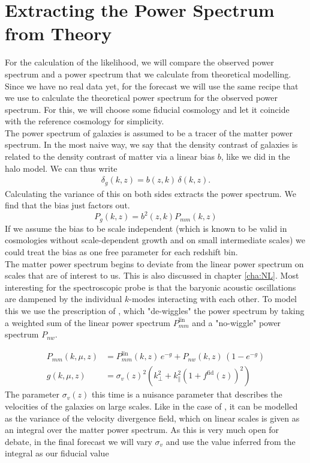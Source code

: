 \documentclass[../main.tex]{subfiles}
\begin{document}
\section{Extracting the Power Spectrum from Theory}
For the calculation of the likelihood, we will compare the observed power spectrum and a power spectrum that we calculate from theoretical modelling. Since we have no real data yet, for the forecast we will use the same recipe that we use to calculate the theoretical power spectrum for the observed power spectrum. For this, we will choose some fiducial cosmology and let it coincide with the reference cosmology for simplicity.\\
The power spectrum of galaxies is assumed to be a tracer of the matter power spectrum. In the most naive way, we say that the density contrast of galaxies is related to the density contrast of matter via a linear bias $b$, like we did in the halo model. We can thus write
\begin{align*}
    \delta_g(k,z) = b(z,k)\,\delta(k,z).
\end{align*}
Calculating the variance of this on both sides extracts the power spectrum. We find that the bias just factors out.  
\begin{equation}
    P_g(k,z) = b^2(z,k) P_{mm}(k,z)
\end{equation}
If we assume the bias to be scale independent (which is known to be valid in cosmologies without scale-dependent growth and on small intermediate scales) we could treat the bias as one free parameter for each redshift bin.\\
The matter power spectrum begins to deviate from the linear power spectrum on scales that are of interest to us. This is also discussed in chapter \ref{cha:NL}. Most interesting for the spectroscopic probe is that the baryonic acoustic oscillations are dampened by the individual $k$-modes interacting with each other. To model this we use the prescription of  \cite{Euclid:2019clj}, which "de-wiggles" the power spectrum by taking a weighted sum of the linear power spectrum $P_{mm}^\mathrm{lin}$ and a "no-wiggle" power spectrum $P_{nw}$.

\begin{align}
    P_{mm}(k,\mu,z) &= P_{mm}^\mathrm{lin}(k,z)\,e^{-g} + P_{nw}(k,z)\,\left(1-e^{-g} \right)\\
    g(k,\mu,z) &= \sigma_v(z)^2 \left(k_\perp^2+k_\|^2\left(1+f^\mathrm{fid}(z)\right)^2 \right)
\end{align}
The parameter $\sigma_v(z)$ this time is a nuisance parameter that describes the velocities of the galaxies on large scales. Like in the case of \hmcode, it can be modelled as the variance of the velocity divergence field, which on linear scales is given as an integral over the matter power spectrum. As this is very much open for debate, in the final forecast we will vary $\sigma_v$ and use the value inferred from the integral as our fiducial value  
\end{document}
